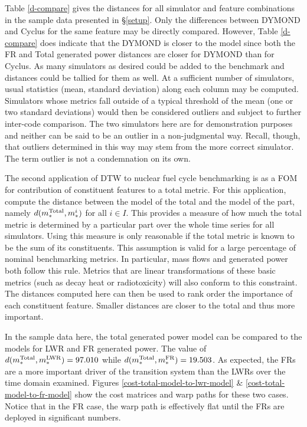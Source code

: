 Table \ref{d-compare} gives the distances for all simulator and feature 
combinations in the sample data presented in \S\ref{setup}. Only the differences between DYMOND and 
Cyclus for the same feature may be directly compared.  However, Table \ref{d-compare} 
does indicate that the DYMOND is closer to the model since both the FR and Total
generated power distances are closer for DYMOND than for Cyclus.  As many
simulators as desired could be added to the benchmark and distances could 
be tallied for them as well. At a sufficient number of simulators, usual 
statistics (mean, standard deviation) along each column may be computed.
Simulators whose metrics fall outside of a typical threshold of the mean
(one or two standard deviations) would then be considered outliers and 
subject to further inter-code comparison. The two simulators here are 
for demonstration purposes and neither can be said to be an outlier in a
non-judgmental way. Recall, though, that outliers determined in this way 
may stem from the more correct simulator. The term outlier is not a 
condemnation on its own.

The second application of DTW to nuclear fuel cycle benchmarking is as a
FOM for contribution of constituent features to a total metric. For this application, 
compute the distance between the model of the total and the model of the 
part, namely $d(m_*^{\mathrm{Total}}, m_*^i)$ for all $i \in I$. This provides a 
measure of how much the total metric is determined by a particular part
over the whole time series for all simulators.
Using this measure is only reasonable if the total metric is known 
to be the sum of its constituents.  This assumption is valid for 
a large percentage of nominal benchmarking metrics. In particular, 
mass flows and generated power both follow this rule. Metrics that are 
linear transformations of these basic metrics (such as decay heat or 
radiotoxicity) will also conform to this constraint. The distances computed here
can then be used to rank order the importance of each constituent feature. 
Smaller distances are closer to the total and thus more important.

In the sample data here, the total generated power model can be compared to 
the models for LWR and FR generated power. The value of 
$d(m_*^{\mathrm{Total}}, m_*^{\mathrm{LWR}}) = 97.010$ while $d(m_*^{\mathrm{Total}}, m_*^{\mathrm{FR}}) = 19.503$.
As expected, the FRs are a more important driver of the transition system 
than the LWRs over the time domain examined. Figures 
\ref{cost-total-model-to-lwr-model} \& \ref{cost-total-model-to-fr-model}
show the cost matrices and warp paths for these two cases.  Notice that in the
FR case, the warp path is effectively flat until the FRs are deployed in 
significant numbers. 
 

